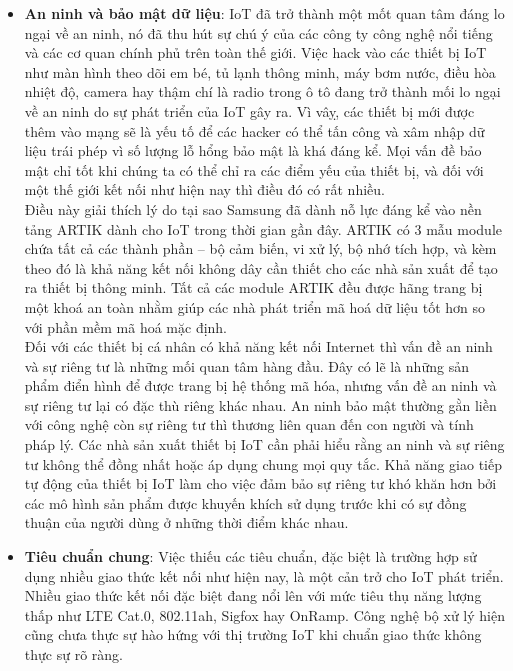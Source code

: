 \begin{itemize}
\item \textbf{An ninh và bảo mật dữ liệu}: IoT đã trở thành một mốt quan tâm đáng lo ngại về an ninh, nó đã thu hút sự chú ý của các công ty công nghệ nổi tiếng và các cơ quan chính phủ trên toàn thế giới. Việc hack vào các thiết bị IoT như màn hình theo dõi em bé, tủ lạnh thông minh, máy bơm nước, điều hòa nhiệt độ, camera hay thậm chí là radio trong ô tô đang trở thành mối lo ngại về an ninh do sự phát triển của IoT gây ra. Vì vâỵ, các thiết bị mới được thêm vào mạng sẽ là yếu tố để các hacker có thể tấn công và xâm nhập dữ liệu trái phép vì số lượng lỗ hổng bảo mật là khá đáng kể.
Mọi vấn đề bảo mật chỉ tốt khi chúng ta có thể chỉ ra các điểm yếu của thiết bị, và đối với một thế giới kết nối như hiện nay thì điều đó có rất nhiều.\\

Điều này giải thích lý do tại sao Samsung đã dành nỗ lực đáng kể vào nền tảng ARTIK dành cho IoT trong thời gian gần đây. ARTIK có 3 mẫu module chứa tất cả các thành phần – bộ cảm biến, vi xử lý, bộ nhớ tích hợp, và kèm theo đó là khả năng kết nối không dây cần thiết cho các nhà sản xuất để tạo ra thiết bị thông minh. Tất cả các module ARTIK đều được hãng trang bị một khoá an toàn nhằm giúp các nhà phát triển mã hoá dữ liệu tốt hơn so với phần mềm mã hoá mặc định.\\

Đối với các thiết bị cá nhân có khả năng kết nối Internet thì vấn đề an ninh và sự riêng tư là những mối quan tâm hàng đầu. Đây có lẽ là những sản phẩm điển hình để được trang bị hệ thống mã hóa, nhưng vấn đề an ninh và sự riêng tư lại có đặc thù riêng khác nhau. An ninh bảo mật thường gằn liền với công nghệ còn sự riêng tư thì thương liên quan đến con người và tính pháp lý. Các nhà sản xuất thiết bị IoT cần phải hiểu rằng an ninh và sự riêng tư không thể đồng nhất hoặc áp dụng chung mọi quy tắc. Khả năng giao tiếp tự động của thiết bị IoT làm cho việc đảm bảo sự riêng tư khó khăn hơn bởi các mô hình sản phẩm được khuyến khích sử dụng trước khi có sự đồng thuận của người dùng ở những thời điểm khác nhau.\\

\item \textbf{Tiêu chuẩn chung}: Việc thiếu các tiêu chuẩn, đặc biệt là trường hợp sử dụng nhiều giao thức kết nối như hiện nay, là một cản trở cho IoT phát triển. Nhiều giao thức kết nối đặc biệt đang nổi lên với mức tiêu thụ năng lượng thấp như LTE Cat.0, 802.11ah, Sigfox hay OnRamp. Công nghệ bộ xử lý hiện cũng chưa thực sự hào hứng với thị trường IoT khi chuẩn giao thức không thực sự rõ ràng.\\


\end{itemize}
